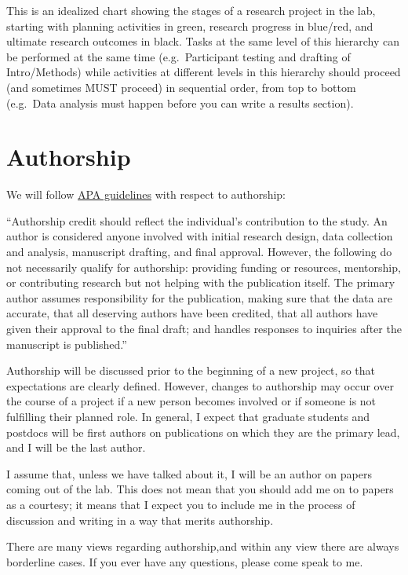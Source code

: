 \documentclass[]{book}
\begin{document}
This is an idealized chart showing the stages of a research project in the lab, starting with planning activities in green, research progress in blue/red, and ultimate research outcomes in black. Tasks at the same level of this hierarchy can be performed at the same time (e.g.~Participant testing and drafting of Intro/Methods) while activities at different levels in this hierarchy should proceed (and sometimes MUST proceed) in sequential order, from top to bottom (e.g.~Data analysis must happen before you can write a results section).

\hypertarget{authorship}{%
\section{Authorship}\label{authorship}}

We will follow \href{https://www.apa.org/research/responsible/publication/}{APA guidelines} with respect to authorship:

``Authorship credit should reflect the individual's contribution to the study. An author is considered anyone involved with initial research design, data collection and analysis, manuscript drafting, and final approval. However, the following do not necessarily qualify for authorship: providing funding or resources, mentorship, or contributing research but not helping with the publication itself. The primary author assumes responsibility for the publication, making sure that the data are accurate, that all deserving authors have been credited, that all authors have given their approval to the final draft; and handles responses to inquiries after the manuscript is published.''

Authorship will be discussed prior to the beginning of a new project, so that expectations are clearly defined. However, changes to authorship may occur over the course of a project if a new person becomes involved or if someone is not fulfilling their planned role. In general, I expect that graduate students and postdocs will be first authors on publications on which they are the primary lead, and I will be the last author.

I assume that, unless we have talked about it, I will be an author on papers coming out of the lab. This does not mean that you should add me on to
papers as a courtesy; it means that I expect you to include me in the process
of discussion and writing in a way that merits authorship.

There are many views regarding authorship,and within any view there are always borderline cases. If you ever have any questions, please come speak to me.
\end{document}
